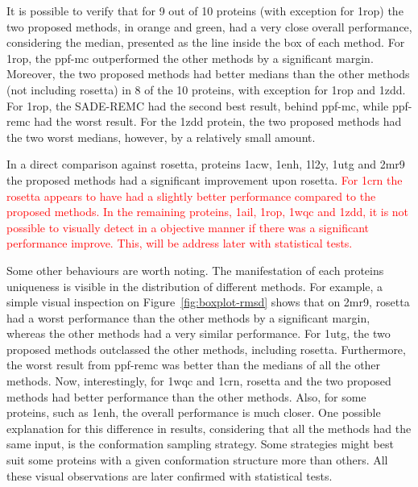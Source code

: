 It is possible to verify that for 9 out of 10 proteins (with exception for 1rop) the
two proposed methods, in orange and green, had a very close overall performance,
considering the median, presented as the line inside the box of each method.
For 1rop, the ppf-mc outperformed the other methods by a significant margin.
Moreover, the two proposed methods had better medians than
the other methods (not including rosetta) in 8 of the 10 proteins,
with exception for 1rop and 1zdd.
For 1rop, the SADE-REMC had the second best result, behind ppf-mc, while ppf-remc
had the worst result.
For the 1zdd protein, the two proposed methods had the two worst
medians, however, by a relatively small amount.

In a direct comparison against rosetta, proteins 1acw, 1enh, 1l2y, 1utg and 2mr9
the proposed methods had a significant improvement upon rosetta.
\textcolor{red}{
For 1crn the rosetta appears to have had
a slightly better performance compared to the proposed methods.
In the remaining proteins, 1ail, 1rop, 1wqc and 1zdd, it is not
possible to visually detect in a objective manner if there was
a significant performance improve. This, will be address later with statistical
tests.
}

Some other behaviours are worth noting. The manifestation of each
proteins uniqueness is visible in the distribution of different methods. For example,
a simple visual inspection on Figure~\ref{fig:boxplot-rmsd} shows that on
2mr9, rosetta had a worst performance than the other methods by a significant margin,
whereas the other methods had a very similar performance. For 1utg, the two proposed
methods outclassed the other methods, including rosetta. Furthermore, the worst
result from ppf-remc was better than the medians of all the other methods.
Now, interestingly, for 1wqc and 1crn, rosetta and the two proposed methods had
better performance than the other methods. Also, for some proteins, such as 1enh,
the overall performance is much closer. One possible explanation for this difference
in results, considering that all the methods had the same input, is the conformation
sampling strategy. Some strategies might best suit some proteins with a given conformation
structure more than others. All these visual observations are later confirmed with
statistical tests.

